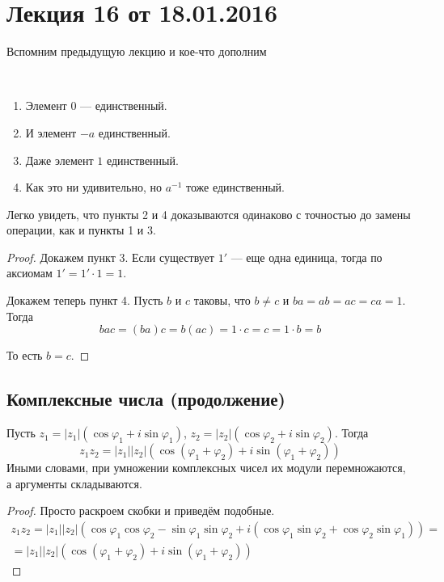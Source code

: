 


\section{Лекция 16 от 18.01.2016}
Вспомним предыдущую лекцию и кое-что дополним
\begin{Comment}
\ 
\begin{enumerate}
    \item Элемент $0$ --- единственный.
    \item И элемент $-a$ единственный.
    \item Даже элемент $1$ единственный.
    \item Как это ни удивительно, но $a^{-1}$ тоже единственный.
\end{enumerate}
\end{Comment}
Легко увидеть, что пункты 2 и 4 доказываются одинаково с точностью до замены операции, как и пункты 1 и 3.

\begin{proof}
Докажем пункт 3. Если существует $1'$ --- еще одна единица, тогда по аксиомам $1'=1'\cdot1=1$.

Докажем теперь пункт 4. Пусть $b$ и $c$ таковы, что $b \neq c$ и $ba = ab = ac = ca = 1$. Тогда 
\[
bac = \left(ba\right)c = b\left(ac\right) = 1\cdot c = c = 1 \cdot b = b
\]

То есть $b = c$.
\end{proof}

\subsection{Комплексные числа (продолжение)}

\begin{Suggestion}
Пусть $z_1 = |z_1|\left(\cos{\varphi_1}+i\sin{\varphi_1}\right)$, $z_2 = |z_2|\left(\cos{\varphi_2} + i\sin{\varphi_2}\right)$. Тогда 
\[
z_1z_2 = |z_1||z_2|\left(\cos\left(\varphi_1 + \varphi_2\right) + i\sin\left(\varphi_1 + \varphi_2\right)\right)
\]
Иными словами, при умножении комплексных чисел их модули перемножаются, а аргументы складываются.
\end{Suggestion}

\begin{proof}
Просто раскроем скобки и приведём подобные.
\begin{gather*}
z_1z_2 = |z_1||z_2|\left(\cos\varphi_1\cos\varphi_2-\sin\varphi_1\sin\varphi_2 + i\left(\cos\varphi_1\sin\varphi_2+\cos\varphi_2\sin\varphi_1\right)\right) = \\ =|z_1||z_2|\left(\cos\left(\varphi_1 + \varphi_2\right) + i\sin\left(\varphi_1 + \varphi_2\right)\right)
\end{gather*}
\end{proof}

